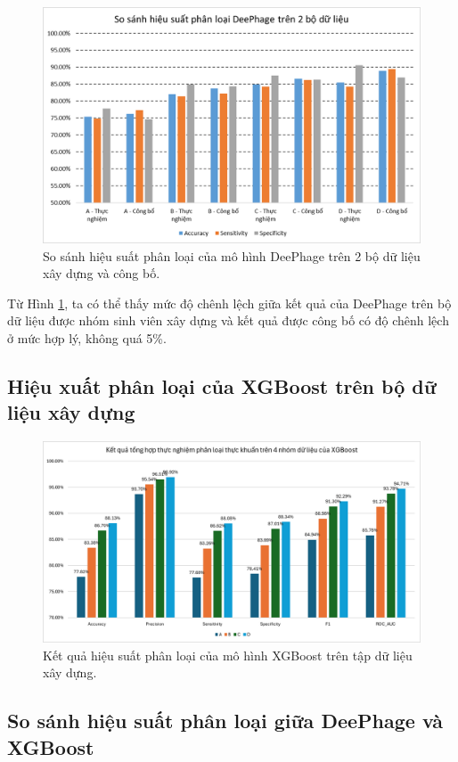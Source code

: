 \begin{figure}[H]
    \centering
    \includegraphics[width=1\linewidth]{figures/result_deephage_exp_vs_paper.png}
    \caption{So sánh hiệu suất phân loại của mô hình DeePhage trên 2 bộ dữ liệu xây dựng và công bố.}
    \label{fig:result_1}
\end{figure}

Từ Hình \ref{fig:result_1}, ta có thể thấy mức độ chênh lệch giữa kết quả của DeePhage trên bộ dữ liệu được nhóm sinh viên xây dựng và kết quả được công bố có độ chênh lệch ở mức hợp lý, không quá 5\%.

\subsection{Hiệu xuất phân loại của XGBoost trên bộ dữ liệu xây dựng}

\begin{figure}[H]
    \centering
    \includegraphics[width=1\linewidth]{figures/result_xgboost.png}
    \caption{Kết quả hiệu suất phân loại của mô hình XGBoost trên tập dữ liệu xây dựng.}
    \label{fig:result_2}
\end{figure}

\subsection{So sánh hiệu suất phân loại giữa DeePhage và XGBoost}

